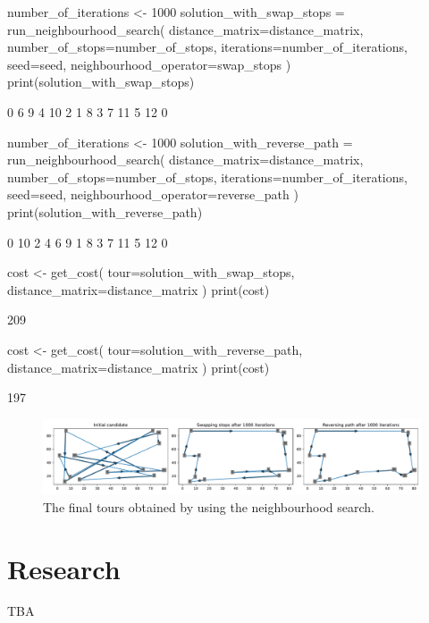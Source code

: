 \begin{Rin}
number_of_iterations <- 1000
solution_with_swap_stops = run_neighbourhood_search(
    distance_matrix=distance_matrix,
    number_of_stops=number_of_stops,
    iterations=number_of_iterations,
seed=seed,
    neighbourhood_operator=swap_stops
)
print(solution_with_swap_stops)
\end{Rin}

\begin{Rout}
 [1]  0  6  9  4 10  2  1  8  3  7 11  5 12  0
\end{Rout}

\begin{Rin}
number_of_iterations <- 1000
solution_with_reverse_path = run_neighbourhood_search(
    distance_matrix=distance_matrix,
    number_of_stops=number_of_stops,
    iterations=number_of_iterations,
seed=seed,
    neighbourhood_operator=reverse_path
)
print(solution_with_reverse_path)
\end{Rin}

\begin{Rout}
 [1]  0 10  2  4  6  9  1  8  3  7 11  5 12  0
\end{Rout}

\begin{Rin}
cost <- get_cost(
    tour=solution_with_swap_stops,
    distance_matrix=distance_matrix
)
print(cost)
\end{Rin}

\begin{Rout}
[1] 209
\end{Rout}

\begin{Rin}
cost <- get_cost(
    tour=solution_with_reverse_path,
    distance_matrix=distance_matrix
)
print(cost)
\end{Rin}

\begin{Rout}
[1] 197
\end{Rout}


\begin{figure}
    \begin{center}
        \includegraphics[width=\textwidth]{./assets/final-tsp-tours-with-R/main.pdf}
    \end{center}
    \caption{The final tours obtained by using the neighbourhood search.}
    \label{fig:final-tsp-tours}
\end{figure}

\section{Research}\label{sec:research}

TBA
